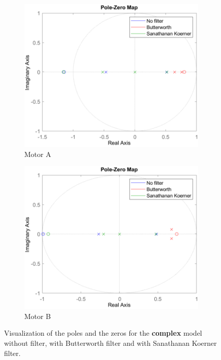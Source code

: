 \documentclass[a4paper,kul]{kulakarticle} %
\begin{document}
\begin{figure}[htp!]
	\centering
	\begin{subfigure}[b]{0.48\textwidth}
		\centering
		\includegraphics[width=\textwidth]{p&z_complex_all_A_cropped.pdf}
		\caption{Motor A}
	\end{subfigure}
	\hfill
	\begin{subfigure}[b]{0.48\textwidth}  
		\centering 
		\includegraphics[width=\textwidth]{p&z_complex_all_B_cropped.pdf}
		\caption{Motor B}
	\end{subfigure}
	\caption[Pole-Zero map complex model]{Visualization of the poles and the zeros for the \textbf{complex} model without filter, with Butterworth filter and with Sanathanan Koerner filter.} 
	\label{fig:pz_complex_all}
\end{figure}
\end{document}
